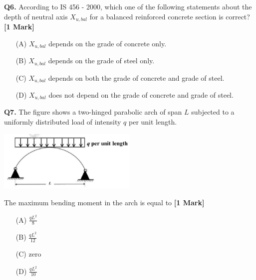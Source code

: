\documentclass[11pt]{article}
\newcommand{\questiona}[2]{
    \noindent\textbf{Q#2.} #1 \hfill \textbf{[1 Mark]}
}
\begin{document}
\vspace{0.5cm}

\questiona{According to IS 456 - 2000, which one of the following statements about the depth of neutral axis \( X_{u,bal} \) for a balanced reinforced concrete section is correct?}{6}
\begin{enumerate}
    \item[(A)] \( X_{u,bal} \) depends on the grade of concrete only.
    \item[(B)] \( X_{u,bal} \) depends on the grade of steel only.
    \item[(C)] \( X_{u,bal} \) depends on both the grade of concrete and grade of steel.
    \item[(D)] \( X_{u,bal} \) does not depend on the grade of concrete and grade of steel.
\end{enumerate}

\vspace{0.5cm}

\questiona{The figure shows a two-hinged parabolic arch of span \( L \) subjected to a uniformly distributed load of intensity \( q \) per unit length.
\begin{center}
\includegraphics[width=0.5\textwidth]{figures/7.png}
\end{center}
The maximum bending moment in the arch is equal to}{7}

\begin{enumerate}
    \item[(A)] \(\frac{qL^2}{8}\)
    \item[(B)] \(\frac{qL^2}{12}\)
    \item[(C)] zero
    \item[(D)] \(\frac{qL^2}{10}\)
\end{enumerate}

\vspace{0.5cm}
\end{document}
